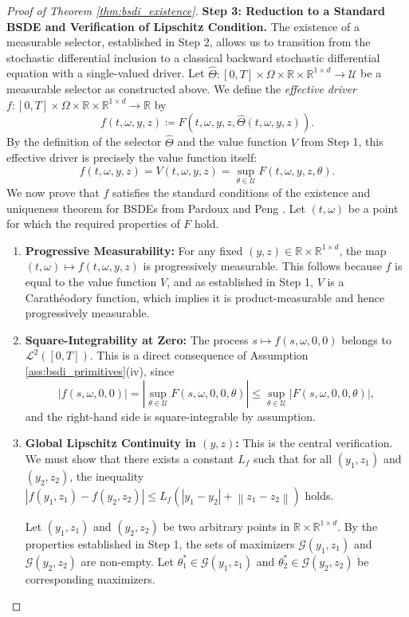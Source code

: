 \documentclass[12pt, letterpaper]{amsart}
\newcommand{\Ucal}{\mathcal{U}}
\newcommand{\Lcalp}[1]{\mathcal{L}^{#1}}
\newcommand{\R}{\mathbb{R}}
\newcommand{\norm}[1]{\left\lVert#1\right\rVert}
\theoremstyle{plain}
\theoremstyle{definition}
\theoremstyle{remark}
\numberwithin{equation}{section} %
\begin{document}
\begin{proof}[Proof of Theorem \ref{thm:bsdi_existence}]
\vspace{1ex}
\noindent\textbf{Step 3: Reduction to a Standard BSDE and Verification of Lipschitz Condition.}
The existence of a measurable selector, established in Step 2, allows us to transition from the stochastic differential inclusion to a classical backward stochastic differential equation with a single-valued driver. Let $\hat{\Theta}: [0,T]\times\Omega\times\R\times\R^{1\times d} \to \Ucal$ be a measurable selector as constructed above. We define the \emph{effective driver} $f: [0,T]\times\Omega\times\R\times\R^{1\times d} \to \R$ by
\[ f(t,\omega,y,z) \coloneqq F(t,\omega,y,z,\hat{\Theta}(t,\omega,y,z)). \]
By the definition of the selector $\hat{\Theta}$ and the value function $V$ from Step 1, this effective driver is precisely the value function itself:
\[ f(t,\omega,y,z) = V(t,\omega,y,z) = \sup_{\theta \in \Ucal} F(t,\omega,y,z,\theta). \]
We now prove that $f$ satisfies the standard conditions of the existence and uniqueness theorem for BSDEs from Pardoux and Peng \cite{PardouxPeng1990}. Let $(t,\omega)$ be a point for which the required properties of $F$ hold.

\begin{enumerate}[label=(\alph*)]
    \item \textbf{Progressive Measurability:} For any fixed $(y,z) \in \R \times \R^{1\times d}$, the map $(t,\omega) \mapsto f(t,\omega,y,z)$ is progressively measurable. This follows because $f$ is equal to the value function $V$, and as established in Step 1, $V$ is a Carathéodory function, which implies it is product-measurable and hence progressively measurable.

    \item \textbf{Square-Integrability at Zero:} The process $s \mapsto f(s,\omega,0,0)$ belongs to $\Lcalp{2}([0,T])$. This is a direct consequence of Assumption \ref{ass:bsdi_primitives}(iv), since
    \[ |f(s,\omega,0,0)| = \left|\sup_{\theta \in \Ucal} F(s, \omega, 0, 0, \theta)\right| \le \sup_{\theta \in \Ucal} |F(s, \omega, 0, 0, \theta)|, \]
    and the right-hand side is square-integrable by assumption.

    \item \textbf{Global Lipschitz Continuity in $(y,z)$:} This is the central verification. We must show that there exists a constant $L_f$ such that for all $(y_1,z_1)$ and $(y_2,z_2)$, the inequality $|f(y_1,z_1) - f(y_2,z_2)| \le L_f(|y_1-y_2| + \norm{z_1-z_2})$ holds.
    
    Let $(y_1,z_1)$ and $(y_2,z_2)$ be two arbitrary points in $\R \times \R^{1\times d}$. By the properties established in Step 1, the sets of maximizers $\mathcal{G}(y_1,z_1)$ and $\mathcal{G}(y_2,z_2)$ are non-empty. Let $\theta_1^* \in \mathcal{G}(y_1,z_1)$ and $\theta_2^* \in \mathcal{G}(y_2,z_2)$ be corresponding maximizers.
    

\end{enumerate}
\end{proof}
\end{document}
